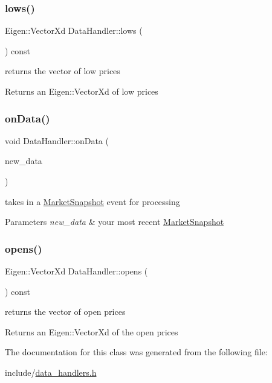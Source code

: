 \subsubsection{\texorpdfstring{lows()}{lows()}}
{\footnotesize\ttfamily Eigen\+::\+Vector\+Xd Data\+Handler\+::lows (\begin{DoxyParamCaption}{ }\end{DoxyParamCaption}) const}



returns the vector of low prices 

\begin{DoxyReturn}{Returns}
an Eigen\+::\+Vector\+Xd of low prices 
\end{DoxyReturn}
\mbox{\label{classDataHandler_af90bc55472239836a8d071710356ceb7}} 
\subsubsection{\texorpdfstring{on\+Data()}{onData()}}
{\footnotesize\ttfamily void Data\+Handler\+::on\+Data (\begin{DoxyParamCaption}\item[{const \hyperlink{classMarketSnapshot}{Market\+Snapshot} \&}]{new\+\_\+data }\end{DoxyParamCaption})}



takes in a \hyperlink{classMarketSnapshot}{Market\+Snapshot} event for processing 


\begin{DoxyParams}{Parameters}
{\em new\+\_\+data} & your most recent \hyperlink{classMarketSnapshot}{Market\+Snapshot} \\
\hline
\end{DoxyParams}
\mbox{\label{classDataHandler_a56ff111f68c862739bd94c193abdf400}} 
\subsubsection{\texorpdfstring{opens()}{opens()}}
{\footnotesize\ttfamily Eigen\+::\+Vector\+Xd Data\+Handler\+::opens (\begin{DoxyParamCaption}{ }\end{DoxyParamCaption}) const}



returns the vector of open prices 

\begin{DoxyReturn}{Returns}
an Eigen\+::\+Vector\+Xd of the open prices 
\end{DoxyReturn}


The documentation for this class was generated from the following file\+:\begin{DoxyCompactItemize}
\item 
include/\hyperlink{data__handlers_8h}{data\+\_\+handlers.\+h}\end{DoxyCompactItemize}
